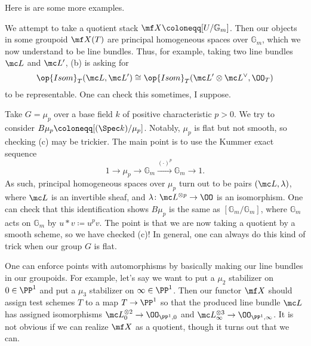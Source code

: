 \documentclass{article}
\begin{document}
Here is are some more examples.
\begin{example}
    We attempt to take a quotient stack $\mf X\coloneqq[U/\mathbb G_m]$. Then our objects in some groupoid $\mf X(T)$ are principal homogeneous spaces over $\mathbb G_m$, which we now understand to be line bundles. Thus, for example, taking two line bundles $\mc L$ and $\mc L'$, (b) is asking for
    \[\op{Isom}_T(\mc L,\mc L')\cong\op{Isom}_T(\mc L'\otimes\mc L^\lor,\OO_T)\]
    to be representable. One can check this sometimes, I suppose.
\end{example}
\begin{example}
    Take $G=\mu_p$ over a base field $k$ of positive characteristic $p>0$. We try to consider $B\mu_p\coloneqq[(\Spec k)/\mu_p]$. Notably, $\mu_p$ is flat but not smooth, so checking (c) may be trickier. The main point is to use the Kummer exact sequence
    \[1\to\mu_p\to\mathbb G_m\stackrel{(\cdot)^p}\to\mathbb G_m\to1.\]
    As such, principal homogeneous spaces over $\mu_p$ turn out to be pairs $(\mc L,\lambda)$, where $\mc L$ is an invertible sheaf, and $\lambda\colon\mc L^{\otimes p}\to\OO$ is an isomorphism. One can check that this identification shows $B\mu_p$ is the same as $[\mathbb G_m/\mathbb G_m]$, where $\mathbb G_m$ acts on $\mathbb G_m$ by $u*v\coloneqq u^pv$. The point is that we are now taking a quotient by a smooth scheme, so we have checked (c)! In general, one can always do this kind of trick when our group $G$ is flat.
\end{example}
\begin{example}
    One can enforce points with automorphisms by basically making our line bundles in our groupoids. For example, let's say we want to put a $\mu_2$ stabilizer on $0\in\PP^1$ and put a $\mu_3$ stabilizer on $\infty\in\PP^1$. Then our functor $\mf X$ should assign test schemes $T$ to a map $T\to\PP^1$ so that the produced line bundle $\mc L$ has assigned isomorphisms $\mc L_0^{\otimes2}\to\OO_{\PP^1,0}$ and $\mc L_\infty^{\otimes3}\to\OO_{\PP^1,\infty}$. It is not obvious if we can realize $\mf X$ as a quotient, though it turns out that we can.
\end{example}
\end{document}
